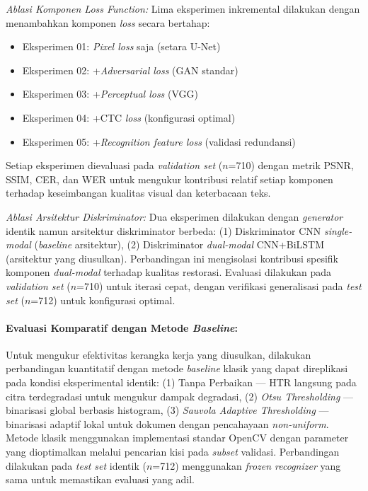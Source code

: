 \documentclass[12pt,a4paper]{book}
\begin{document}
\textit{Ablasi Komponen Loss Function:} Lima eksperimen inkremental dilakukan dengan menambahkan komponen \textit{loss} secara bertahap:
\begin{itemize}[leftmargin=1.5cm, nosep]
\item Eksperimen 01: \textit{Pixel loss} saja (setara U-Net)
\item Eksperimen 02: +\textit{Adversarial loss} (GAN standar)
\item Eksperimen 03: +\textit{Perceptual loss} (VGG)
\item Eksperimen 04: +CTC \textit{loss} (konfigurasi optimal)
\item Eksperimen 05: +\textit{Recognition feature loss} (validasi redundansi)
\end{itemize}
Setiap eksperimen dievaluasi pada \textit{validation set} ($n$=710) dengan metrik PSNR, SSIM, CER, dan WER untuk mengukur kontribusi relatif setiap komponen terhadap keseimbangan kualitas visual dan keterbacaan teks.

\textit{Ablasi Arsitektur Diskriminator:} Dua eksperimen dilakukan dengan \textit{generator} identik namun arsitektur diskriminator berbeda: (1) Diskriminator CNN \textit{single-modal} (\textit{baseline} arsitektur), (2) Diskriminator \textit{dual-modal} CNN+BiLSTM (arsitektur yang diusulkan). Perbandingan ini mengisolasi kontribusi spesifik komponen \textit{dual-modal} terhadap kualitas restorasi. Evaluasi dilakukan pada \textit{validation set} ($n$=710) untuk iterasi cepat, dengan verifikasi generalisasi pada \textit{test set} ($n$=712) untuk konfigurasi optimal.

\paragraph{Evaluasi Komparatif dengan Metode \textit{Baseline}:}
Untuk mengukur efektivitas kerangka kerja yang diusulkan, dilakukan perbandingan kuantitatif dengan metode \textit{baseline} klasik yang dapat direplikasi pada kondisi eksperimental identik: (1) Tanpa Perbaikan — HTR langsung pada citra terdegradasi untuk mengukur dampak degradasi, (2) \textit{Otsu Thresholding} — binarisasi global berbasis histogram, (3) \textit{Sauvola Adaptive Thresholding} — binarisasi adaptif lokal untuk dokumen dengan pencahayaan \textit{non-uniform}. Metode klasik menggunakan implementasi standar OpenCV dengan parameter yang dioptimalkan melalui pencarian kisi pada \textit{subset} validasi. Perbandingan dilakukan pada \textit{test set} identik ($n$=712) menggunakan \textit{frozen recognizer} yang sama untuk memastikan evaluasi yang adil.
\end{document}
